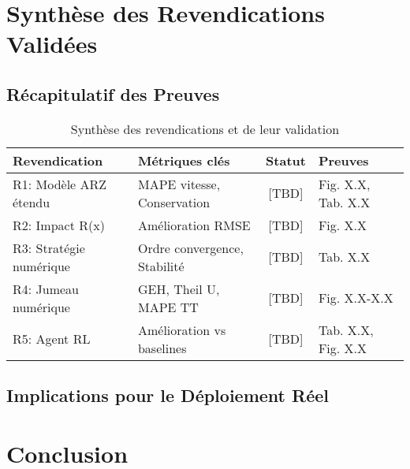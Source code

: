 \section{Synthèse des Revendications Validées}
\label{sec:synthese_revendications}

\subsection{Récapitulatif des Preuves}
\label{subsec:recapitulatif_preuves}

\begin{table}[htbp]
  \centering
  \caption{Synthèse des revendications et de leur validation}
  \label{tab:synthese_revendications}
  \begin{tabular}{|l|l|c|l|}
    \hline
    \textbf{Revendication}  & \textbf{Métriques clés}      & \textbf{Statut} & \textbf{Preuves}   \\
    \hline
    R1: Modèle ARZ étendu   & MAPE vitesse, Conservation   & [TBD]           & Fig. X.X, Tab. X.X \\
    R2: Impact R(x)         & Amélioration RMSE            & [TBD]           & Fig. X.X           \\
    R3: Stratégie numérique & Ordre convergence, Stabilité & [TBD]           & Tab. X.X           \\
    R4: Jumeau numérique    & GEH, Theil U, MAPE TT        & [TBD]           & Fig. X.X-X.X       \\
    R5: Agent RL            & Amélioration vs baselines    & [TBD]           & Tab. X.X, Fig. X.X \\
    \hline
  \end{tabular}
\end{table}


\subsection{Implications pour le Déploiement Réel}
\label{subsec:implications_deploiement}



\section{Conclusion}
\label{sec:conclusion_validation}

